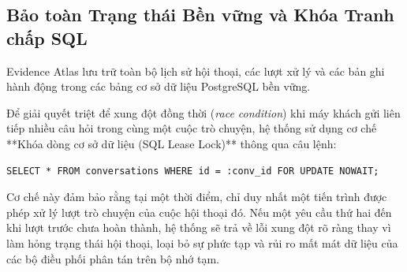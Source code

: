 \subsection{Bảo toàn Trạng thái Bền vững và Khóa Tranh chấp SQL}
Evidence Atlas lưu trữ toàn bộ lịch sử hội thoại, các lượt xử lý và các bản ghi hành động trong các bảng cơ sở dữ liệu PostgreSQL bền vững. 

Để giải quyết triệt để xung đột đồng thời (\textit{race condition}) khi máy khách gửi liên tiếp nhiều câu hỏi trong cùng một cuộc trò chuyện, hệ thống sử dụng cơ chế **Khóa dòng cơ sở dữ liệu (SQL Lease Lock)** thông qua câu lệnh:
\begin{verbatim}
SELECT * FROM conversations WHERE id = :conv_id FOR UPDATE NOWAIT;
\end{verbatim}
Cơ chế này đảm bảo rằng tại một thời điểm, chỉ duy nhất một tiến trình được phép xử lý lượt trò chuyện của cuộc hội thoại đó. Nếu một yêu cầu thứ hai đến khi lượt trước chưa hoàn thành, hệ thống sẽ trả về lỗi xung đột rõ ràng thay vì làm hỏng trạng thái hội thoại, loại bỏ sự phức tạp và rủi ro mất mát dữ liệu của các bộ điều phối phân tán trên bộ nhớ tạm.
